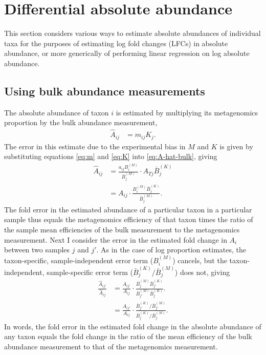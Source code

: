\documentclass[
]{article}
\theoremstyle{definition}
\theoremstyle{definition}
\theoremstyle{definition}
\theoremstyle{definition}
\theoremstyle{remark}
\begin{document}
\hypertarget{absolute}{%
\section{Differential absolute abundance}\label{absolute}}

This section considers various ways to estimate absolute abundances of individual taxa for the purposes of estimating log fold changes (LFCs) in absolute abundance, or more generically of performing linear regression on log absolute abundance.

\hypertarget{using-bulk-abundance-measurements}{%
\subsection{Using bulk abundance measurements}\label{using-bulk-abundance-measurements}}

The absolute abundance of taxon \(i\) is estimated by multiplying its metagenomics proportion by the bulk abundance measurement,
\begin{align}
  \label{eq:A-hat-bulk}
  \hat A_{ij} &= m_{ij} K_j.
\end{align}
The error in this estimate due to the experimental bias in \(M\) and \(K\) is given by substituting equations \eqref{eq:m} and \eqref{eq:K} into \eqref{eq:A-hat-bulk}, giving
\begin{align}
  \label{eq:error-bulk}
  \hat A_{ij} &= \frac{a_{ij} B^{(M)}_i}{\bar B^{(M)}_j} \cdot A_{Tj} \bar B^{(K)}_j
  \\&= A_{ij} \cdot \frac{B^{(M)}_i \bar B^{(K)}_j}{\bar B^{(M)}_j}.
\end{align}
The fold error in the estimated abundance of a particular taxon in a particular sample thus equals the metagenomics efficiency of that taxon times the ratio of the sample mean efficiencies of the bulk measurement to the metagenomics measurement.
Next I consider the error in the estimated fold change in \(A_i\) between two samples \(j\) and \(j'\).
As in the case of log proportion estimates, the taxon-specific, sample-independent error term (\(B^{(M)}_i\)) cancels, but the taxon-independent, sample-specific error term (\({\bar B^{(K)}_j}/{\bar B^{(M)}_j}\)) does not, giving
\begin{align}
  \label{eq:fc-bulk}
  \frac{\hat A_{ij'}}{\hat A_{ij}}
  &= \frac{A_{ij'}}{A_{ij}} 
  \cdot \frac{\bar B^{(M)}_j \bar B^{(K)}_{j'}}{\bar B^{(M)}_{j'} \bar B^{(K)}_j}.
  \\&= \frac{A_{ij'}}{A_{ij}} 
  \cdot \frac{\bar B^{(K)}_{j'} / \bar B^{(M)}_{j'}}{\bar B^{(K)}_j / \bar B^{(M)}_j }.
\end{align}
In words, the fold error in the estimated fold change in the absolute abundance of any taxon equals the fold change in the ratio of the mean efficiency of the bulk abundance measurement to that of the metagenomics measurement.
\end{document}
